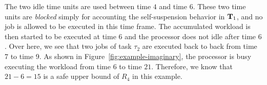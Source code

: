   The two idle time units are used between time $4$ and time
  $6$. These two time units are \emph{blocked} simply for accounting
  the self-suspension behavior in ${\bf T}_1$, and no job is allowed
  to be executed in this time frame.  The accumulated workload is then
  started to be executed at time $6$ and the processor does not idle
  after time $6$. Over here, we see that two jobs of task $\tau_2$ are
  executed back to back from time 7 to time 9. As shown in Figure~\ref{fig:example-imaginary}, the
  processor is busy executing the workload from time $6$ to time
  $21$. Therefore, we know that $21-6=15$ is a safe upper bound of
  $R_4$ in this example.




